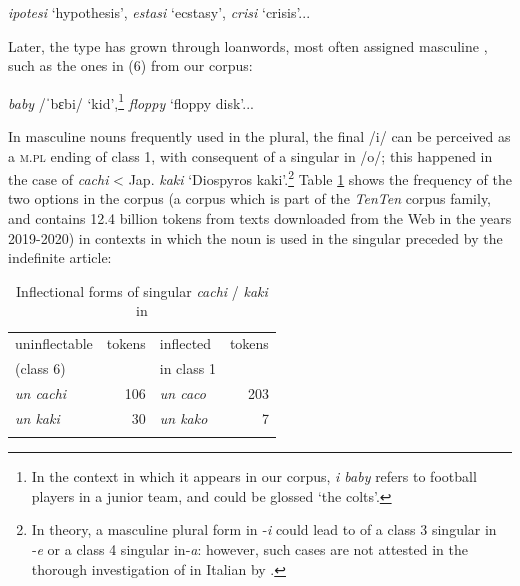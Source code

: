 \documentclass[output=paper,colorlinks,citecolor=brown]{langscibook}
\begin{document}
\begin{exe}
	\ex \label{10ex5}
	\emph{ipotesi} ‘hypothesis’, \emph{estasi} ‘ecstasy’, \emph{crisi} ‘crisis’...
\end{exe}

Later, the type has grown through loanwords, most often assigned masculine , such as the ones in (6) from our corpus:

\begin{exe}
	\ex \label{10ex6}
	\emph{baby} /ˈbɛbi/ ‘kid’,\footnote{In the context in which it appears in our corpus, \emph{i baby} refers to football players in a junior team, and could be glossed ‘the colts’.} \emph{floppy} ‘floppy disk’...
\end{exe}

In masculine nouns frequently used in the plural, the final /i/ can be perceived as a \textsc{m.pl} ending of class 1, with consequent  of a singular in /o/; this happened in the case of \emph{cachi} \textless{} Jap. \emph{kaki} `Diospyros kaki'.\footnote{In theory, a masculine plural form in ‑\emph{i} could lead to  of a class 3 singular in ‑\emph{e} or a class 4 singular in‑\emph{a}: however, such cases are not attested in the thorough investigation of  in Italian by \citet{dachille2005-retroforma}.} Table \ref{10tab10} shows the frequency of the two options in the  corpus (a corpus which is part of the \emph{TenTen} corpus family, and contains 12.4 billion tokens from texts downloaded from the Web in the years 2019-2020) in contexts in which the noun is used in the singular preceded by the indefinite article:

\begin{table}[ht]
	\centering
	\begin{tabularx}{0.7\textwidth}{XrXr}
		\lsptoprule
			uninflectable & tokens & inflected & tokens \\
			(class 6\is{inflectional class}) & & in class 1 & \\
			\midrule
			\emph{un cachi} & 106 & \emph{un caco} & 203 \\
			\emph{un kaki} & 30 & \emph{un kako} & 7 \\
		\lspbottomrule
	\end{tabularx}
	\caption{Inflectional forms of singular \emph{cachi} / \emph{kaki} in }
	\label{10tab10}
\end{table}
\end{document}
